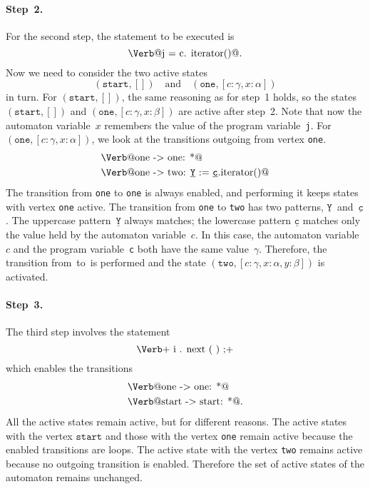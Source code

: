 \documentclass{sigplanconf} %
\makeatletter
\newcommand{\pattern}[1]{\ensuremath{\mathtt{\underline{#1}}}}
\newcommand{\start}{\ensuremath{\mathtt{start}}\xspace}
\newcommand{\verbline}[2][]{\[\text{\Verb@#2@}#1\]}
\theoremstyle{definition}
\theoremstyle{remark}
\makeatother
\begin{document}
\paragraph{Step~2.}
For the second step, the statement to be executed is \verbline[.]{j = c.\PY{n+na}{iterator}()}
Now we need to consider the two active states \[(\start,[])\quad\text{and}\quad(\texttt{one},[c:\gamma,x:\alpha])\] in turn.
For $(\start,[])$, the same reasoning as for step~1 holds, so the states $(\start,[])$ and $(\mathtt{one},[c:\gamma,x:\beta])$ are active after step~2.
Note that now the automaton variable~$x$ remembers the value of the program variable~{\tt j}.
For $(\texttt{one},[c:\gamma,x:\alpha])$, we look at the transitions outgoing from vertex {\tt one}.
\begin{align*}
&\text{\Verb@one -> one: *@} \\
&\text{\Verb@one -> two: \pattern Y := \pattern c.iterator()@}
\end{align*}
The transition from \texttt{one} to \texttt{one} is always enabled, and performing it keeps states with vertex \texttt{one} active.
The transition from \texttt{one} to \texttt{two} has two patterns, \pattern Y~and~\pattern c.
The uppercase pattern~\pattern Y always matches;
the lowercase pattern \pattern c matches only the value held by the automaton variable~$c$.
In this case, the automaton variable~$c$ and the program variable~\texttt{c} both have the same value~$\gamma$.
Therefore, the transition from~\Verb@one@ to~\Verb@two@ is performed and the state $(\mathtt{two},[c:\gamma,x:\alpha,y:\beta])$ is activated.

\paragraph{Step~3.}

The third step involves the statement
\[\text{\Verb+\PY{n}{i}\PY{o}{.}\PY{n+na}{next}\PY{o}{(}\PY{o}{)}\PY{o}{;}+}\]
which enables the transitions
\begin{align*}
&\text{\Verb@one -> one: *@}\\
&\text{\Verb@start -> start: *@}.
\end{align*}
All the active states remain active, but for different reasons.
The active states with the vertex \start and those with the vertex \texttt{one} remain active because the enabled transitions are loops.
The active state with the vertex \texttt{two} remains active because no outgoing transition is enabled.
Therefore the set of active states of the automaton remains unchanged.
\end{document}
